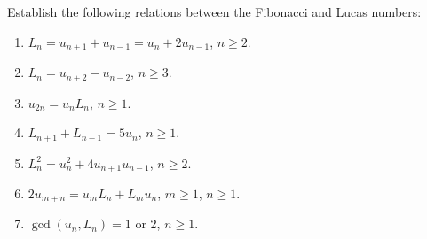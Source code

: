 \begin{exercise}
    Establish the following relations between the Fibonacci and Lucas numbers:
    \begin{enumerate}
        \item $L_n = u_{n+1} + u_{n-1} = u_{n} + 2u_{n-1}$, $n \geq 2$. 
        \item $L_n = u_{n+2} - u_{n-2}$, $n \geq 3$.
        \item $u_{2n} = u_nL_n$, $n \geq 1$.
        \item $L_{n+1} + L_{n-1} = 5u_n$, $n \geq 1$.
        \item $L_n^2 = u_n^2 + 4u_{n+1}u_{n-1}$, $n \geq 2$.
        \item $2u_{m+n} = u_mL_n + L_mu_n$, $m \geq 1$, $n\geq1$.
        \item $\gcd(u_n, L_n) = 1$ or 2, $n \geq 1$.\\
    \end{enumerate}
\end{exercise}

